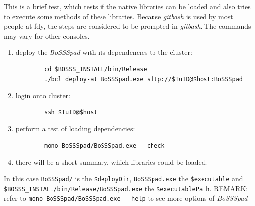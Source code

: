 \documentclass[11pt,twoside,a4paper]{fdyartcl}
\begin{document}
This is a brief test, which tests if the native libraries can be loaded and also tries to execute some methods of these libraries.
Because \emph{gitbash} is used by most people at fdy, the steps are considered to be prompted in \emph{gitbash}. The commands may vary for other consoles.
\begin{enumerate}
	\item deploy the \emph{BoSSSpad} with its dependencies to the cluster:
	\begin{verbatim}
		cd $BOSSS_INSTALL/bin/Release
		./bcl deploy-at BoSSSpad.exe sftp://$TuID@$host:BoSSSpad
	\end{verbatim}
	\item login onto cluster:
	\begin{verbatim}
		ssh $TuID@$host
	\end{verbatim}
	\item perform a test of loading dependencies:
	\begin{verbatim}
		mono BoSSSpad/BoSSSpad.exe --check
	\end{verbatim}
	\item there will be a short summary, which libraries could be loaded.
\end{enumerate}
In this case \verb|BoSSSpad/| is the \verb|$deployDir|, \verb|BoSSSpad.exe| the \verb|$executable| and \verb|$BOSSS_INSTALL/bin/Release/BoSSSpad.exe| the \verb|$executablePath|.
REMARK: refer to \verb|mono BoSSSpad/BoSSSpad.exe --help| to see more options of \emph{BoSSSpad}
\end{document}
